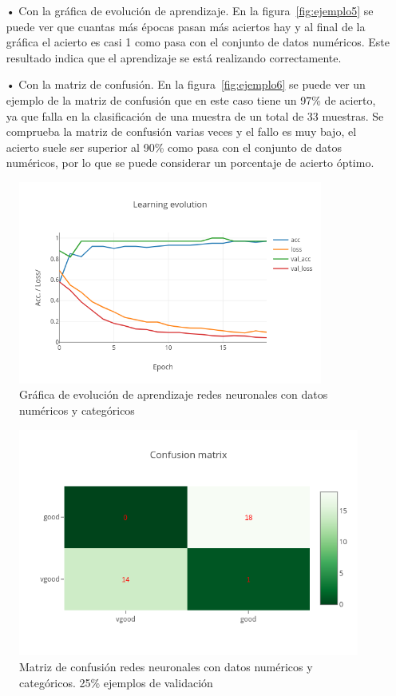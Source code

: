 \documentclass[a4paper, 12pt]{book}
\begin{document}
\begin{itemize}
\item[•] Con la gráfica de evolución de aprendizaje. En la figura~\ref{fig:ejemplo5} se puede ver que cuantas más épocas pasan más aciertos hay y al final de la gráfica el acierto es casi 1 como pasa con el conjunto de datos numéricos.
Este resultado indica que el aprendizaje se está realizando correctamente.
 \item[•] Con la matriz de confusión. En la figura~\ref{fig:ejemplo6} se puede ver un ejemplo de la matriz de confusión que en este caso tiene un 97\% de acierto, ya que falla en la clasificación de una muestra de un total de 33 muestras. Se comprueba la matriz de confusión varias veces y el fallo es muy bajo, el acierto suele ser superior al 90\% como pasa con el conjunto de datos numéricos, por lo que se puede considerar un porcentaje de acierto óptimo.
 \end{itemize}
 
 \begin{figure}
	\centering
	\includegraphics[width=10cm, keepaspectratio]{img/le_numycat_rn.png}
	\caption{Gráfica de evolución de aprendizaje redes neuronales con datos numéricos y categóricos} 	\label{fig:ejemplo18}
\end{figure}

\begin{figure}
	\centering
	\includegraphics[width=12cm, keepaspectratio]{img/cm_numycat_rn.png}
	\caption{Matriz de confusión redes neuronales con datos numéricos y categóricos. 25\% ejemplos de validación} 	
	\label{fig:ejemplo19}
\end{figure}
\end{document}
